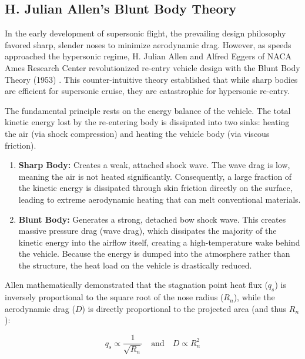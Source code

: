 \subsection{H. Julian Allen’s Blunt Body Theory }
\par
In the early development of supersonic flight, the prevailing design philosophy favored sharp, slender noses to minimize aerodynamic drag. However, as speeds approached the hypersonic regime, H. Julian Allen and Alfred Eggers of NACA Ames Research Center revolutionized re-entry vehicle design with the Blunt Body Theory (1953) \cite{AndersonHypersonic}. This counter-intuitive theory established that while sharp bodies are efficient for supersonic cruise, they are catastrophic for hypersonic re-entry.
\par
The fundamental principle rests on the energy balance of the vehicle. The total kinetic energy lost by the re-entering body is dissipated into two sinks: heating the air (via shock compression) and heating the vehicle body (via viscous friction).

\begin{enumerate}
    \item \textbf{Sharp Body:} Creates a weak, attached shock wave. The wave drag is low, meaning the air is not heated significantly. Consequently, a large fraction of the kinetic energy is dissipated through skin friction directly on the surface, leading to extreme aerodynamic heating that can melt conventional materials.
    
    \item \textbf{Blunt Body:} Generates a strong, detached bow shock wave. This creates massive pressure drag (wave drag), which dissipates the majority of the kinetic energy into the airflow itself, creating a high-temperature wake behind the vehicle. Because the energy is dumped into the atmosphere rather than the structure, the heat load on the vehicle is drastically reduced.
\end{enumerate}

Allen mathematically demonstrated that the stagnation point heat flux ($q_s$) is inversely proportional to the square root of the nose radius ($R_n$), while the aerodynamic drag ($D$) is directly proportional to the projected area (and thus $R_n$):

\begin{equation}
    q_s \propto \frac{1}{\sqrt{R_n}} \quad \text{and} \quad D \propto R_n^2
\end{equation}

